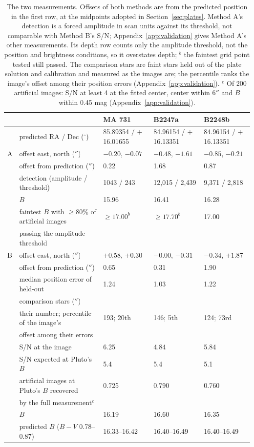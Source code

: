 \documentclass[11pt]{article}
\begin{document}
\begin{table}[ht]
\centering
\footnotesize
\setlength{\tabcolsep}{3.5pt}
\begin{tabular}{@{}lllll@{}}
\toprule
 & & MA 731 & B2247a & B2248b \\
\midrule
 & predicted RA / Dec ($^\circ$) & 85.89354 / $+$16.01655 & 84.96154 / $+$16.13351 & 84.96154 / $+$16.13351 \\
\midrule
A & offset east, north ($''$) & $-0.20$, $-0.07$ & $-0.48$, $-1.61$ & $-0.85$, $-0.21$ \\
 & offset from prediction ($''$) & 0.22 & 1.68 & 0.87 \\
 & detection (amplitude / threshold) & 1043 / 243 & 12{,}015 / 2{,}439 & 9{,}371 / 2{,}818 \\
 & $B$ & 15.96 & 16.41 & 16.28 \\
 & faintest $B$ with $\ge80\%$ of artificial images & $\ge17.00^{b}$ & $\ge17.70^{b}$ & 17.00 \\
 & \quad passing the amplitude threshold & & & \\
B & offset east, north ($''$) & $+0.58$, $+0.30$ & $-0.00$, $-0.31$ & $-0.34$, $+1.87$ \\
 & offset from prediction ($''$) & 0.65 & 0.31 & 1.90 \\
 & median position error of held-out & 1.24 & 1.03 & 1.22 \\
 & \quad comparison stars ($''$) & & & \\
 & their number; percentile of the image's & 193; 20th & 146; 5th & 124; 73rd \\
 & \quad offset among their errors & & & \\
 & S/N at the image & 6.25 & 4.84 & 5.84 \\
 & S/N expected at Pluto's $B$ & 5.4 & 5.4 & 5.1 \\
 & artificial images at Pluto's $B$ recovered & 0.725 & 0.790 & 0.760 \\
 & \quad by the full measurement$^{c}$ & & & \\
 & $B$ & 16.19 & 16.60 & 16.35 \\
\midrule
 & predicted $B$ ($B-V$ 0.78--0.87) & 16.33--16.42 & 16.40--16.49 & 16.40--16.49 \\
\bottomrule
\end{tabular}
\caption{The two measurements. Offsets of both methods are from the predicted position in the first row, at the midpoints adopted in Section~\ref{sec:plates}. Method A's detection is a forced amplitude in scan units against its threshold, not comparable with Method B's S/N; Appendix~\ref{app:validation} gives Method A's other measurements. Its depth row counts only the amplitude threshold, not the position and brightness conditions, so it overstates depth; $^{b}$ the faintest grid point tested still passed. The comparison stars are faint stars held out of the plate solution and calibration and measured as the images are; the percentile ranks the image's offset among their position errors (Appendix~\ref{app:validation}). $^{c}$ Of 200 artificial images: S/N at least 4 at the fitted center, center within $6''$ and $B$ within 0.45 mag (Appendix~\ref{app:validation}).}
\label{tab:measure}
\end{table}
\end{document}
